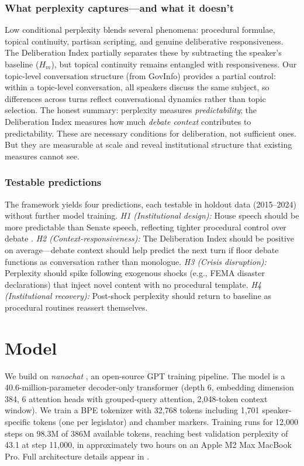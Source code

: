 \documentclass[12pt]{article}
\newcommand{\Hm}{H_m}
\begin{document}
\subsubsection*{What perplexity captures---and what it doesn't}
Low conditional perplexity blends several phenomena: procedural formulae, topical continuity, partisan scripting, and genuine deliberative responsiveness. The Deliberation Index partially separates these by subtracting the speaker's baseline ($\Hm$), but topical continuity remains entangled with responsiveness. Our topic-level conversation structure (from GovInfo) provides a partial control: within a topic-level conversation, all speakers discuss the same subject, so differences across turns reflect conversational dynamics rather than topic selection. The honest summary: perplexity measures \textit{predictability}; the Deliberation Index measures how much \textit{debate context} contributes to predictability. These are necessary conditions for deliberation, not sufficient ones. But they are measurable at scale and reveal institutional structure that existing measures cannot see.

\subsubsection*{Testable predictions}
The framework yields four predictions, each testable in holdout data (2015--2024) without further model training. \textit{H1 (Institutional design):} House speech should be more predictable than Senate speech, reflecting tighter procedural control over debate \citep{perssonTabellini2003}. \textit{H2 (Context-responsiveness):} The Deliberation Index should be positive on average---debate context should help predict the next turn if floor debate functions as conversation rather than monologue. \textit{H3 (Crisis disruption):} Perplexity should spike following exogenous shocks (e.g., FEMA disaster declarations) that inject novel content with no procedural template. \textit{H4 (Institutional recovery):} Post-shock perplexity should return to baseline as procedural routines reassert themselves.


\section{Model}

We build on \textit{nanochat} \citep{karpathy2025}, an open-source GPT training pipeline. The model is a 40.6-million-parameter decoder-only transformer (depth 6, embedding dimension 384, 6 attention heads with grouped-query attention, 2,048-token context window). We train a BPE tokenizer with 32,768 tokens including 1,701 speaker-specific tokens (one per legislator) and chamber markers. Training runs for 12,000 steps on 98.3M of 386M available tokens, reaching best validation perplexity of 43.1 at step 11,000, in approximately two hours on an Apple M2 Max MacBook Pro. Full architecture details appear in .
\end{document}
